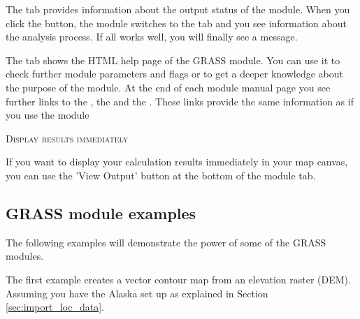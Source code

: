 
The  tab provides information about the output status of the
module. When you click the  button, the module switches to the
 tab and you see information about the analysis process. If all
works well, you will finally see a  message.


The  tab shows the HTML help page of the GRASS module. You can
use it to check further module parameters and flags or to get a deeper
knowledge about the purpose of the module. At the end of each module
manual page you see further links to the , the
 and the . These links provide
the same information as if you use the module 

\begin{Tip}\caption{\textsc{Display results immediately}}
If you want to display your calculation results immediately in your
map canvas, you can use the 'View Output' button at the bottom of the
module tab.
\end{Tip}

\subsection{GRASS module examples}
The following examples will demonstrate the power of some of the GRASS modules.


The first example creates a vector contour map from an elevation raster
(DEM). Assuming you have the Alaska  set up as explained
in Section \ref{sec:import_loc_data}.

